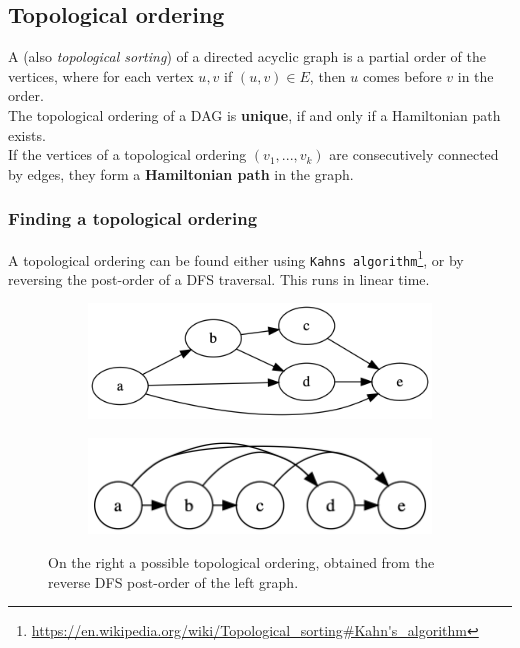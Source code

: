 \documentclass[a3paper, landscape, 11pt]{article} %
\begin{document}
\begin{multicols*}{4}
\subsection*{Topological ordering}
A  (also \textit{topological sorting}) of a directed acyclic graph is a partial order of the vertices, where for each vertex $u,v$ if $(u,v)\in E$, then $u$ comes before $v$ in the order.\\

The topological ordering of a DAG is \textbf{unique}, if and only if a Hamiltonian path exists.\\

If the vertices of a topological ordering $(v_1,...,v_k)$ are consecutively connected by edges, they form a \textbf{Hamiltonian path} in the graph. 

\subsubsection*{Finding a topological ordering}

A topological ordering can be found either using \texttt{Kahns algorithm}\footnote{\url{https://en.wikipedia.org/wiki/Topological_sorting\#Kahn's_algorithm}}, or by reversing the post-order of a DFS traversal. This runs in linear time.\\

\begin{figure}[H]
  \begin{subfigure}[b]{0.45\columnwidth}
    \centering
    \includegraphics[width=1\textwidth]{images/dag-example-3.png}
    \label{fig:image4}
  \end{subfigure}
  \hfill
  \begin{subfigure}[b]{0.46\columnwidth}
    \centering
    \includegraphics[width=1\textwidth]{images/dag-ordered-round.png}
    \label{fig:image5}
  \end{subfigure}
  \caption*{On the right a possible topological ordering, obtained from the reverse DFS post-order  of the left graph. }
\end{figure}


\end{multicols*}
\end{document}
